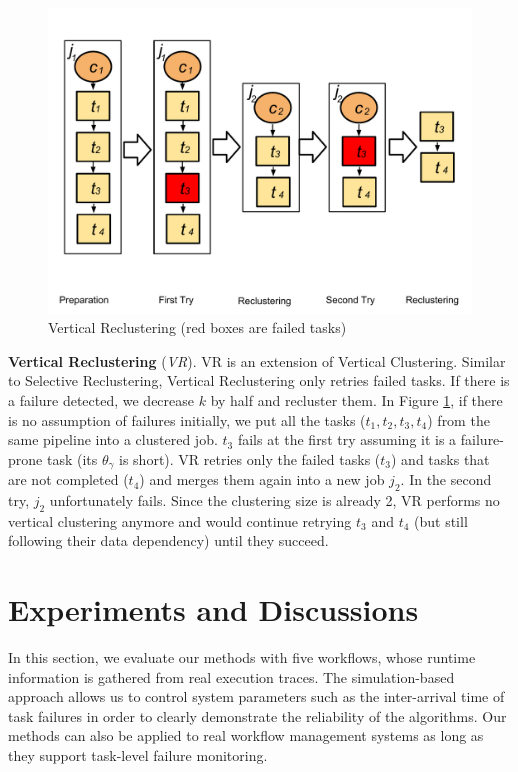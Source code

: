 \documentclass{IOS-Book-Article}
\begin{document}
\begin{figure}[!htb]
\centering
  \includegraphics[width=0.85\linewidth]{vr.pdf}
  \caption{Vertical Reclustering (red boxes are failed tasks)}
  \label{fig:clustering_vr}
\end{figure}

\textbf{Vertical Reclustering} (\emph{VR}). VR is an extension of Vertical Clustering. Similar to Selective Reclustering, Vertical Reclustering only retries failed tasks.
If there is a failure detected, we decrease $k$ by half and recluster them. In Figure \ref{fig:clustering_vr}, if there is no assumption of failures initially, we put all the tasks ($t_1, t_2, t_3, t_4$) from the same  pipeline into a clustered job. $t_3$ fails at the first try assuming it is a failure-prone task (its $\theta_{\gamma}$ is short). VR retries only the failed tasks ($t_3$) and tasks that are not completed ($t_4$) and merges them again into a new job $j_2$. In the second try, $j_2$ unfortunately fails. Since the clustering size is already 2, VR performs no vertical clustering anymore and would continue retrying $t_3$ and $t_4$ (but still following their data dependency) until they succeed. 


\section{Experiments and Discussions}
\label{sec:experiments}


In this section, we evaluate our methods with five workflows, whose runtime information is gathered from real execution traces. The simulation-based approach allows us to control system parameters such as the inter-arrival time of task failures in order to clearly demonstrate the reliability of the algorithms. Our methods can also be applied to real workflow management systems as long as they support task-level failure monitoring. 
\end{document}
